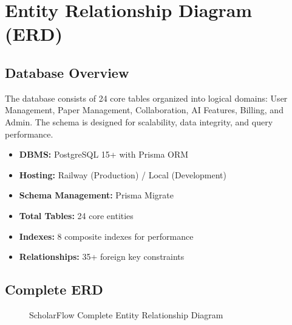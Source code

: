 \chapter{Entity Relationship Diagram (ERD)}
\label{ch:erd}

\section{Database Overview}
\label{sec:erd-overview}

The \projectname{} database consists of 24 core tables organized into logical domains: User Management, Paper Management, Collaboration, AI Features, Billing, and Admin. The schema is designed for scalability, data integrity, and query performance.

\begin{infobox}
\begin{itemize}
    \item \textbf{DBMS:} PostgreSQL 15+ with Prisma ORM
    \item \textbf{Hosting:} Railway (Production) / Local (Development)
    \item \textbf{Schema Management:} Prisma Migrate
    \item \textbf{Total Tables:} 24 core entities
    \item \textbf{Indexes:} 8 composite indexes for performance
    \item \textbf{Relationships:} 35+ foreign key constraints
\end{itemize}
\end{infobox}

\section{Complete ERD}
\label{sec:erd-diagram}

\begin{figure}[H]
\centering
{}
\caption{ScholarFlow Complete Entity Relationship Diagram}
\label{fig:erd-complete}
\end{figure}

